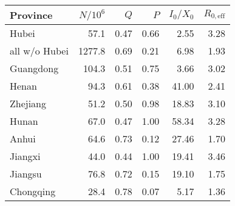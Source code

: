 \begin{tabular}{lrrrrr}
\hline
 Province      &   $N/10^6$ &   $Q$ &   $P$ &   $I_0/X_0$ &   $R_{0,\mathrm{eff}}$ \\
\hline
 Hubei         &       57.1 &  0.47 &  0.66 &        2.55 &                   3.28 \\
 all w/o Hubei &     1277.8 &  0.69 &  0.21 &        6.98 &                   1.93 \\
 Guangdong     &      104.3 &  0.51 &  0.75 &        3.66 &                   3.02 \\
 Henan         &       94.3 &  0.61 &  0.38 &       41.00 &                   2.41 \\
 Zhejiang      &       51.2 &  0.50 &  0.98 &       18.83 &                   3.10 \\
 Hunan         &       67.0 &  0.47 &  1.00 &       58.34 &                   3.28 \\
 Anhui         &       64.6 &  0.73 &  0.12 &       27.46 &                   1.70 \\
 Jiangxi       &       44.0 &  0.44 &  1.00 &       19.41 &                   3.46 \\
 Jiangsu       &       76.8 &  0.72 &  0.15 &       19.10 &                   1.75 \\
 Chongqing     &       28.4 &  0.78 &  0.07 &        5.17 &                   1.36 \\
\hline
\end{tabular}
